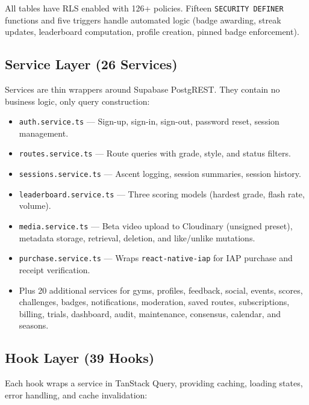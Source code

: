\documentclass[12pt,a4paper]{report}
\renewcommand\_{\textunderscore\hspace{0pt}}
\begin{document}
All tables have RLS enabled with 126+ policies. Fifteen \texttt{SECURITY DEFINER} functions and five triggers handle automated logic (badge awarding, streak updates, leaderboard computation, profile creation, pinned badge enforcement).

\subsection{Service Layer (26 Services)}

Services are thin wrappers around Supabase PostgREST. They contain no business logic, only query construction:

\begin{itemize}[noitemsep]
    \item \texttt{auth.service.ts} --- Sign-up, sign-in, sign-out, password reset, session management.
    \item \texttt{routes.service.ts} --- Route queries with grade, style, and status filters.
    \item \texttt{sessions.service.ts} --- Ascent logging, session summaries, session history.
    \item \texttt{leaderboard.service.ts} --- Three scoring models (hardest grade, flash rate, volume).
    \item \texttt{media.service.ts} --- Beta video upload to Cloudinary (unsigned preset), metadata storage, retrieval, deletion, and like/unlike mutations.
    \item \texttt{purchase.service.ts} --- Wraps \texttt{react-native-iap} \cite{IaDo25} for IAP purchase and receipt verification.
    \item Plus 20 additional services for gyms, profiles, feedback, social, events, scores, challenges, badges, notifications, moderation, saved routes, subscriptions, billing, trials, dashboard, audit, maintenance, consensus, calendar, and seasons.
\end{itemize}

\subsection{Hook Layer (39 Hooks)}

Each hook wraps a service in TanStack Query, providing caching, loading states, error handling, and cache invalidation:
\end{document}
